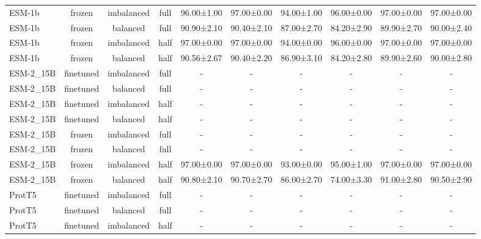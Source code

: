 \begin{tabular}{lccccccccc}
      ESM-1b &         frozen & imbalanced &      full &  96.00±1.00 &  97.00±0.00 &  94.00±1.00 &  96.00±0.00 &  97.00±0.00 &  97.00±0.00 \\
      ESM-1b &         frozen &   balanced &      full &  90.90±2.10 &  90.40±2.10 &  87.00±2.70 &  84.20±2.90 &  89.90±2.70 &  90.00±2.40 \\
      ESM-1b &         frozen & imbalanced &      half &  97.00±0.00 &  97.00±0.00 &  94.00±0.00 &  96.00±0.00 &  97.00±0.00 &  97.00±0.00 \\
      ESM-1b &         frozen &   balanced &      half &  90.56±2.67 &  90.40±2.20 &  86.90±3.10 &  84.20±2.80 &  89.90±2.60 &  90.00±2.80 \\
   ESM-2\_15B &      finetuned & imbalanced &      full &           - &           - &           - &           - &           - &           - \\
   ESM-2\_15B &      finetuned &   balanced &      full &           - &           - &           - &           - &           - &           - \\
   ESM-2\_15B &      finetuned & imbalanced &      half &           - &           - &           - &           - &           - &           - \\
   ESM-2\_15B &      finetuned &   balanced &      half &           - &           - &           - &           - &           - &           - \\
   ESM-2\_15B &         frozen & imbalanced &      full &           - &           - &           - &           - &           - &           - \\
   ESM-2\_15B &         frozen &   balanced &      full &           - &           - &           - &           - &           - &           - \\
   ESM-2\_15B &         frozen & imbalanced &      half &  97.00±0.00 &  97.00±0.00 &  93.00±0.00 &  95.00±1.00 &  97.00±0.00 &  97.00±0.00 \\
   ESM-2\_15B &         frozen &   balanced &      half &  90.80±2.10 &  90.70±2.70 &  86.00±2.70 &  74.00±3.30 &  91.00±2.80 &  90.50±2.90 \\
      ProtT5 &      finetuned & imbalanced &      full &           - &           - &           - &           - &           - &           - \\
      ProtT5 &      finetuned &   balanced &      full &           - &           - &           - &           - &           - &           - \\
      ProtT5 &      finetuned & imbalanced &      half &           - &           - &           - &           - &           - &           - \\

\end{tabular}
